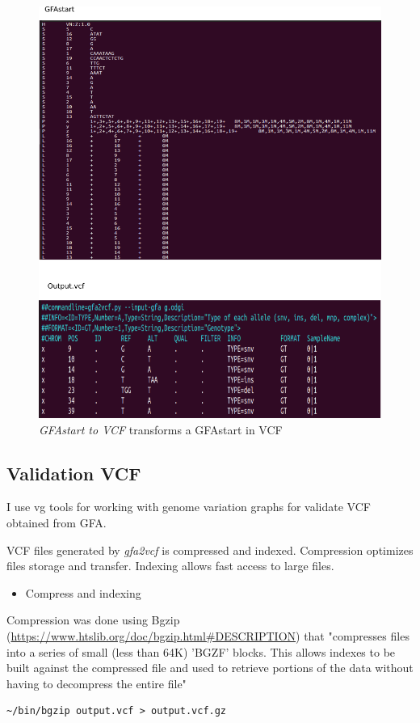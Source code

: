 \begin{figure}[H]
\centering
\includegraphics[width=0.70 \textwidth]{fig/gfa2vcf.png}
\decoRule
\caption{\textit{GFAstart to VCF} transforms a GFAstart in VCF}
\label{fig:validationgraph.png}
\end{figure}
\subsection{Validation VCF}

I use vg tools for working with genome variation graphs for validate VCF obtained from GFA. 

VCF files generated by \textit{gfa2vcf} is compressed and indexed. Compression optimizes files storage and transfer. Indexing allows fast access to large files. 
\begin{itemize}
\item Compress and indexing
\end{itemize}

Compression was done using Bgzip (\url{https://www.htslib.org/doc/bgzip.html#DESCRIPTION}) that "compresses files into a series of small (less than 64K) 'BGZF' blocks. This allows indexes to be built against the compressed file and used to retrieve portions of the data without having to decompress the entire file"

\begin{verbatim}
~/bin/bgzip output.vcf > output.vcf.gz
\end{verbatim}

